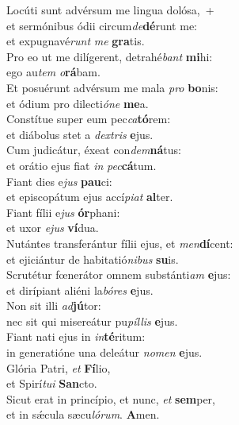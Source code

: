 \evenverse Locúti sunt advérsum me lingua dolósa,~+\\\evenverse  et sermónibus ódii circum\textit{de}\textbf{dé}runt me:~\*\\
\evenverse et expugnavé\textit{runt} \textit{me} \textbf{gra}tis.\\
\oddverse Pro eo ut me dilígerent, detrahé\textit{bant} \textbf{mi}hi:~\*\\
\oddverse ego au\textit{tem} \textit{o}\textbf{rá}bam.\\
\evenverse Et posuérunt advérsum me mala \textit{pro} \textbf{bo}nis:~\*\\
\evenverse et ódium pro dilecti\textit{ó}\textit{ne} \textbf{me}a.\\
\oddverse Constítue super eum pec\textit{ca}\textbf{tó}rem:~\*\\
\oddverse et diábolus stet a \textit{dex}\textit{tris} \textbf{e}jus.\\
\evenverse Cum judicátur, éxeat con\textit{dem}\textbf{ná}tus:~\*\\
\evenverse et orátio ejus fiat \textit{in} \textit{pec}\textbf{cá}tum.\\
\oddverse Fiant dies e\textit{jus} \textbf{pau}ci:~\*\\
\oddverse et episcopátum ejus accí\textit{pi}\textit{at} \textbf{al}ter.\\
\evenverse Fiant fílii e\textit{jus} \textbf{ór}phani:~\*\\
\evenverse et uxor \textit{e}\textit{jus} \textbf{ví}dua.\\
\oddverse Nutántes transferántur fílii ejus, et \textit{men}\textbf{dí}cent:~\*\\
\oddverse et ejiciántur de habitatió\textit{ni}\textit{bus} \textbf{su}is.\\
\evenverse Scrutétur fœnerátor omnem substánti\textit{am} \textbf{e}jus:~\*\\
\evenverse et dirípiant aliéni la\textit{bó}\textit{res} \textbf{e}jus.\\
\oddverse Non sit illi \textit{ad}\textbf{jú}tor:~\*\\
\oddverse nec sit qui misereátur pu\textit{píl}\textit{lis} \textbf{e}jus.\\
\evenverse Fiant nati ejus in \textit{in}\textbf{té}ritum:~\*\\
\evenverse in generatióne una deleátur \textit{no}\textit{men} \textbf{e}jus.\\
\oddverse Glória Patri, \textit{et} \textbf{Fí}lio,~\*\\
\oddverse et Spirí\textit{tu}\textit{i} \textbf{San}cto.\\
\evenverse Sicut erat in princípio, et nunc, \textit{et} \textbf{sem}per,~\*\\
\evenverse et in sǽcula sæcu\textit{ló}\textit{rum}. \textbf{A}men.\\
